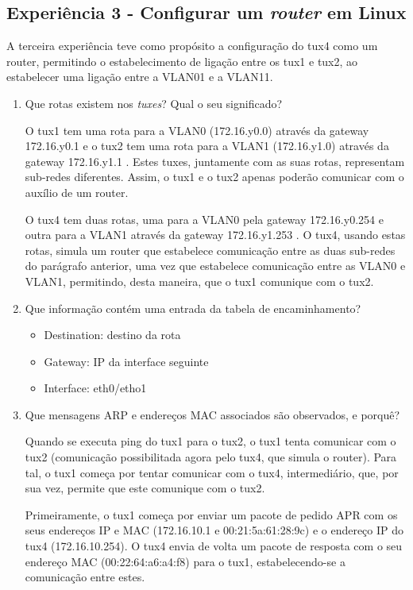\documentclass{article}
\begin{document}
\subsection{Experiência 3 - Configurar um \textit{router} em Linux}
A terceira experiência teve como propósito a configuração do tux4 como um router, permitindo o estabelecimento de ligação entre os tux1 e tux2, ao estabelecer uma ligação entre a VLAN01 e a VLAN11.
\begin{enumerate}
\item Que rotas existem nos \textit{tuxes}? Qual o seu significado?

O tux1 tem uma rota para a VLAN0  (172.16.y0.0) através da gateway 172.16.y0.1 e o tux2 tem uma rota para a VLAN1 (172.16.y1.0) através da gateway 172.16.y1.1 . Estes tuxes, juntamente com as suas rotas, representam sub-redes diferentes. Assim, o tux1 e o tux2 apenas poderão comunicar com o auxílio de um router.

O tux4 tem duas rotas, uma para a VLAN0 pela gateway 172.16.y0.254 e outra para a VLAN1 através da gateway 172.16.y1.253 . O tux4, usando estas rotas, simula um router que estabelece comunicação entre as duas sub-redes do parágrafo anterior, uma vez que estabelece comunicação entre as VLAN0 e VLAN1, permitindo, desta maneira, que o tux1 comunique com o tux2.


\item Que informação contém uma entrada da tabela de encaminhamento?

\begin{itemize}
    \item Destination: destino da rota
    \item Gateway: IP da interface seguinte
    \item Interface: eth0/etho1
\end{itemize}


\item Que mensagens ARP e endereços MAC associados são observados, e porquê?

Quando se executa ping do tux1 para o tux2, o tux1 tenta comunicar com o tux2 (comunicação possibilitada agora pelo tux4, que simula o router). Para tal, o tux1 começa por tentar comunicar com o tux4, intermediário, que, por sua vez, permite que este comunique com o tux2.

Primeiramente, o tux1 começa por enviar um pacote de pedido APR com os seus endereços IP e MAC (172.16.10.1 e 00:21:5a:61:28:9c) e o endereço IP do tux4 (172.16.10.254). O tux4 envia de volta um pacote de resposta com o seu endereço MAC (00:22:64:a6:a4:f8) para o tux1, estabelecendo-se a comunicação entre estes.


\end{enumerate}
\end{document}
